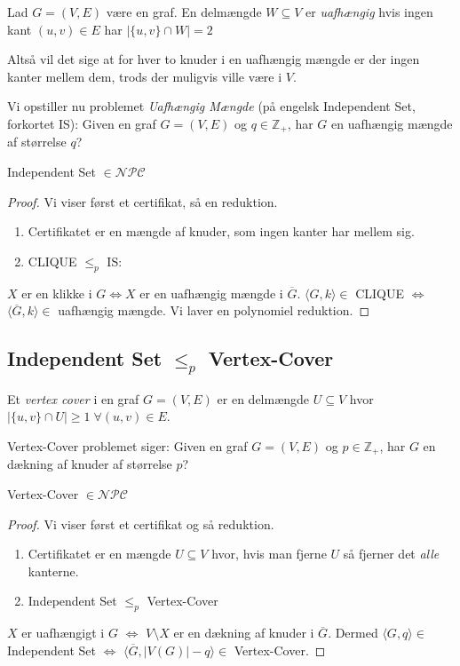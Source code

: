 \begin{definition}
	Lad $G = (V,E)$ være en graf. En delmængde $W \subseteq V$ er \textit{uafhængig} hvis ingen kant $(u,v) \in E$ har $|\{u,v\} \cap W| = 2$
\end{definition}

Altså vil det sige at for hver to knuder i en uafhængig mængde er der ingen kanter mellem dem, trods der muligvis ville være i $V$.

Vi opstiller nu problemet \textit{Uafhængig Mængde} (på engelsk Independent Set, forkortet IS): Given en graf $G = (V,E)$ og $q \in \mathbb{Z}_{+}$, har $G$ en uafhængig mængde af størrelse $q$?

\begin{theorem}
	Independent Set \(\in \mathcal{NPC}\)
\end{theorem}

\begin{proof}
	Vi viser først et certifikat, så en reduktion.
	\begin{enumerate}
		\item Certifikatet er en mængde af knuder, som ingen kanter har mellem sig.
		\item CLIQUE $\le_{p}$ IS:
	\end{enumerate}
	$X$ er en klikke i $G \iff X$  er en uafhængig mængde i $\overline{G}$. \(\langle G, k \rangle \in\) CLIQUE $\iff$ \(\langle \overline{G}, k \rangle \in\) uafhængig mængde. Vi laver en polynomiel reduktion.
\end{proof}

\subsection{Independent Set $\le_{p}$ Vertex-Cover}%
\label{subsec:label}

\begin{definition}
	Et \textit{vertex cover} i en graf $G = (V,E)$ er en delmængde $U \subseteq V$ hvor $|\{u,v\} \cap U| \ge 1 \; \forall (u,v) \in E$.
\end{definition}

Vertex-Cover problemet siger: Given en graf $G = (V,E)$ og $p \in \mathbb{Z}_{+}$, har $G$ en dækning af knuder af størrelse $p$?

\begin{theorem}
	Vertex-Cover $\in \mathcal{NPC}$
\end{theorem}
\begin{proof}
	Vi viser først et certifikat og så reduktion.
	\begin{enumerate}
		\item Certifikatet er en mængde $U \subseteq V$ hvor, hvis man fjerne $U$ så fjerner det \textit{alle} kanterne.
		\item Independent Set $\le_{p}$ Vertex-Cover
	\end{enumerate}
	$X$ er uafhængigt i $G$ $\iff$ $V \setminus X$ er en dækning af knuder i $\overline{G}$. Dermed \(\langle G, q \rangle \in \) Independent Set $\iff$ \(\langle \overline{G}, |V(G)| - q \rangle \in \) Vertex-Cover.
\end{proof}


